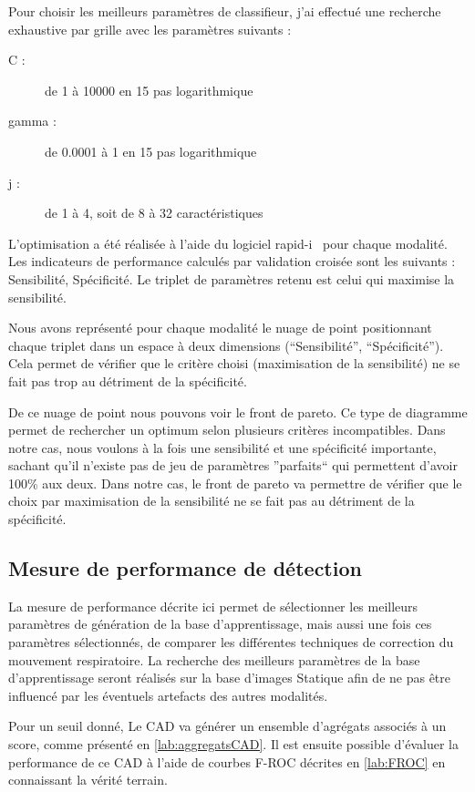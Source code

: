 Pour choisir les meilleurs paramètres de classifieur, j'ai effectué une recherche exhaustive par grille avec les paramètres suivants :

\begin{description}
 \item [C :] de 1 à 10000 en 15 pas logarithmique
 \item [gamma :] de 0.0001 à 1 en 15 pas logarithmique
 \item [j :] de 1 à 4, soit de 8 à 32 caractéristiques
\end{description}

L'optimisation a été réalisée à l'aide du logiciel rapid-i~\cite{mierswa2006} pour chaque modalité. Les indicateurs de performance calculés par validation croisée sont les suivants : Sensibilité, Spécificité. Le triplet de paramètres retenu est celui qui maximise la sensibilité.

Nous avons représenté pour chaque modalité le nuage de point positionnant chaque triplet dans un espace à deux dimensions (``Sensibilité'', ``Spécificité''). Cela permet de vérifier que le critère choisi (maximisation de la sensibilité) ne se fait pas trop au détriment de la spécificité.

De ce nuage de point nous pouvons voir le front de pareto. Ce type de diagramme permet de rechercher un optimum selon plusieurs critères incompatibles. Dans notre cas, nous voulons à la fois une sensibilité et une spécificité importante, sachant qu'il n'existe pas de jeu de paramètres ''parfaits`` qui permettent d'avoir 100\% aux deux. Dans notre cas, le front de pareto va permettre de vérifier que le choix par maximisation de la sensibilité ne se fait pas au détriment de la spécificité.


\subsection{Mesure de performance de détection}

La mesure de performance décrite ici permet de sélectionner les meilleurs paramètres de génération de la base d'apprentissage, mais aussi une fois ces paramètres sélectionnés, de comparer les différentes techniques de correction du mouvement respiratoire. La recherche des meilleurs paramètres de la base d'apprentissage seront réalisés sur la base d'images Statique afin de ne pas être influencé par les éventuels artefacts des autres modalités.

Pour un seuil donné, Le CAD va générer un ensemble d'agrégats associés à un score, comme présenté en \ref{lab:aggregatsCAD}. Il est ensuite possible d'évaluer la performance de ce CAD à l'aide de courbes F-ROC décrites en \ref{lab:FROC} en connaissant la vérité terrain.

